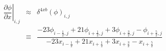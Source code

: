 \documentclass[gmd,manuscript]{copernicus}
\begin{document}
\begin{eqnarray}
\nonumber
\left. \dfrac{\partial \phi}{\partial x}\right|_{i,j} & \approx & \delta^{4xb} \left( \phi \right)_{i,j}\\
& \equiv & \dfrac{-23 \phi_{i-\frac{1}{2},j} + 21 \phi_{i+\frac{1}{2},j} + 3 \phi_{i+\frac{3}{2},j} - \phi_{i+\frac{5}{2},j}}
                 {-23    x_{i-\frac{1}{2}}   + 21    x_{i+\frac{1}{2}}   + 3    x_{i+\frac{3}{2}}   -    x_{i+\frac{5}{2}}}
\end{eqnarray}


\end{document}
